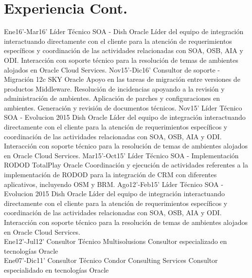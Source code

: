 \documentclass[]{friggeri-cv}
\begin{document}
\section{Experiencia Cont.}
\begin{entrylist}
  \entry
    {Ene16'-Mar16'}
    {Líder Técnico SOA - Dish}
    {Oracle}
    {Líder del equipo de integración interactuando directamente con el cliente para la atención de requerimientos específicos y coordinación de las actividades relacionadas con SOA, OSB, AIA y ODI. Interacción con soporte técnico para la resolución de temas de ambientes alojados en Oracle Cloud Services.}
 \entry
    {Nov15'-Dic16'}
    {Consultor de soporte - Migración 12c SKY}
    {Oracle}
    {Apoyo en las tareas de migración entre versiones de productos Middleware. Resolución de incidencias apoyando a la revisión y administración de ambientes. Aplicación de parches y configuraciones en ambientes. Generación y revisión de documentos técnicos.}
\entry
    {Nov15'}
    {Líder Técnico SOA - Evolucion 2015 Dish}
    {Oracle}
    {Líder del equipo de integración interactuando directamente con el cliente para la atención de requerimientos específicos y coordinación de las actividades relacionadas con SOA, OSB, AIA y ODI. Interacción con soporte técnico para la resolución de temas de ambientes alojados en Oracle Cloud Services.}
    \entry
    {Mar15'-Oct15'}
    {Líder Técnico SOA - Implementación RODOD TotalPlay}
    {Oracle}
    {Coordinación y ejecución de actividades referentes a la implementación de RODOD para la integración de CRM con diferentes aplicativos, incluyendo OSM y BRM.}
  \entry
    {Ago12'-Feb15'}
    {Líder Técnico SOA - Evolucion 2015 Dish}
    {Oracle}
    {Líder del equipo de integración interactuando directamente con el cliente para la atención de requerimientos específicos y coordinación de las actividades relacionadas con SOA, OSB, AIA y ODI. Interacción con soporte técnico para la resolución de temas de ambientes alojados en Oracle Cloud Services.\\}
  \entry
    {Ene12'-Jul12'}
    {Consultor Técnico}
    {Multisolusions}
    {Consultor especializado en tecnologías Oracle\\}
	\entry
    {Ene07'-Dic11'}
    {Consultor Técnico}
    {Condor Consulting Services}
    {Consultor especialidado en tecnologías Oracle\\}
\end{entrylist}
\\
\end{document}
